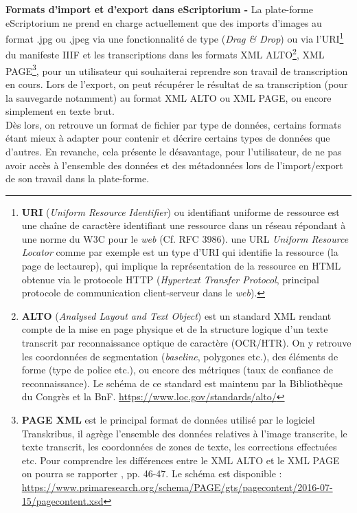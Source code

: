 \textbf{Formats d'import et d'export dans eScriptorium -}
La plate-forme eScriptorium ne prend en charge actuellement que des imports d'images au format .jpg ou .jpeg via une fonctionnalité de type  (\textit{Drag \& Drop}) ou via l'URI\footnote{\textbf{URI} (\textit{Uniform Resource Identifier}) ou identifiant uniforme de ressource est une chaîne de caractère identifiant une ressource dans un réseau répondant à une norme du W3C pour le \textit{web} (Cf. RFC 3986). une URL \textit{Uniform Resource Locator} comme par exemple  est un type d'URI qui identifie la ressource (la page de lectaurep), qui implique la représentation de la ressource en HTML obtenue via le protocole HTTP (\textit{Hypertext Transfer Protocol}, principal protocole de communication client-serveur dans le \textit{web}).} du manifeste IIIF et les transcriptions dans les formats XML ALTO\footnote{\textbf{ALTO} (\textit{Analysed Layout and Text Object}) est un standard XML rendant compte de la mise en page physique et de la structure logique d'un texte transcrit par reconnaissance optique de caractère (OCR/HTR). On y retrouve les coordonnées de segmentation (\textit{baseline}, polygones etc.), des éléments de forme (type de police etc.), ou encore des métriques (taux de confiance de reconnaissance). Le schéma de ce standard est maintenu par la Bibliothèque du Congrès et la BnF. \url{https://www.loc.gov/standards/alto/}}, XML PAGE\footnote{\textbf{PAGE XML} est le principal format de données utilisé par le logiciel Transkribus, il agrège l'ensemble des données relatives à l'image transcrite, le texte transcrit, les coordonnées de zones de texte, les corrections effectuées etc. Pour comprendre les différences entre le XML ALTO et le XML PAGE on pourra se rapporter \cite{bonhomme_defis_2018}, pp. 46-47. Le schéma est disponible : \url{https://www.primaresearch.org/schema/PAGE/gts/pagecontent/2016-07-15/pagecontent.xsd}}, pour un utilisateur qui souhaiterai reprendre son travail de transcription en cours. Lors de l'export, on peut récupérer le résultat de sa transcription (pour la sauvegarde notamment) au format XML ALTO ou XML PAGE, ou encore simplement en texte brut.\\

Dès lors, on retrouve un format de fichier par type de données, certains formats étant mieux à adapter pour contenir et décrire certains types de données que d'autres. En revanche, cela présente le désavantage, pour l'utilisateur, de ne pas avoir accès à l'ensemble des données et des métadonnées lors de l'import/export de son travail dans la plate-forme.\\


